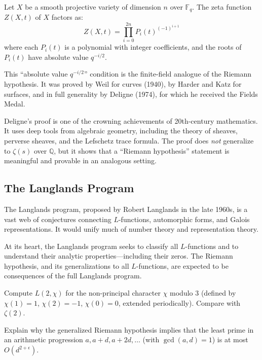 \begin{theorem}
\label{thm:weil}
Let $X$ be a smooth projective variety of dimension $n$ over $\mathbb{F}_q$. The zeta function $Z(X, t)$ of $X$ factors as:
\[
Z(X, t) = \prod_{i=0}^{2n} P_i(t)^{(-1)^{i+1}}
\]
where each $P_i(t)$ is a polynomial with integer coefficients, and the roots of $P_i(t)$ have absolute value $q^{-i/2}$.
\end{theorem}

This ``absolute value $q^{-i/2}$'' condition is the finite-field analogue of the Riemann hypothesis. It was proved by Weil for curves (1940), by Harder and Katz for surfaces, and in full generality by Deligne (1974), for which he received the Fields Medal.

Deligne's proof is one of the crowning achievements of 20th-century mathematics. It uses deep tools from algebraic geometry, including the theory of sheaves, perverse sheaves, and the Lefschetz trace formula. The proof does \emph{not} generalize to $\zeta(s)$ over $\mathbb{Q}$, but it shows that a ``Riemann hypothesis'' statement is meaningful and provable in an analogous setting.

\subsection{The Langlands Program}

The Langlands program, proposed by Robert Langlands in the late 1960s, is a vast web of conjectures connecting $L$-functions, automorphic forms, and Galois representations. It would unify much of number theory and representation theory.

At its heart, the Langlands program seeks to classify all $L$-functions and to understand their analytic properties---including their zeros. The Riemann hypothesis, and its generalizations to all $L$-functions, are expected to be consequences of the full Langlands program.

\begin{exercise}
\label{ex:dirichlet}
Compute $L(2, \chi)$ for the non-principal character $\chi$ modulo 3 (defined by $\chi(1) = 1$, $\chi(2) = -1$, $\chi(0) = 0$, extended periodically). Compare with $\zeta(2)$.
\end{exercise}

\begin{exercise}
\label{ex:grh_implies}
Explain why the generalized Riemann hypothesis implies that the least prime in an arithmetic progression $a, a + d, a + 2d, \ldots$ (with $\gcd(a,d) = 1$) is at most $O(d^{2 + \epsilon})$.
\end{exercise}

